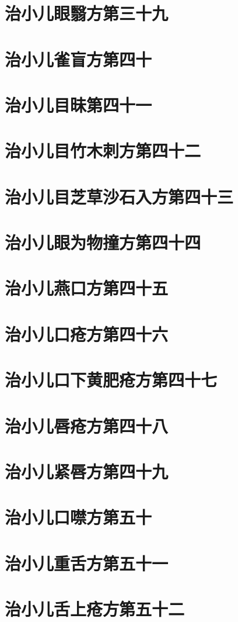 \documentclass[a4paper,12pt,UTF8,twoside]{ctexbook}
\begin{document}
\chapter{治小儿眼翳方第三十九}
\chapter{治小儿雀盲方第四十}
\chapter{治小儿目昧第四十一}
\chapter{治小儿目竹木刺方第四十二}
\chapter{治小儿目芝草沙石入方第四十三}
\chapter{治小儿眼为物撞方第四十四}
\chapter{治小儿燕口方第四十五}
\chapter{治小儿口疮方第四十六}
\chapter{治小儿口下黄肥疮方第四十七}
\chapter{治小儿唇疮方第四十八}
\chapter{治小儿紧唇方第四十九}
\chapter{治小儿口噤方第五十}
\chapter{治小儿重舌方第五十一}
\chapter{治小儿舌上疮方第五十二}
\end{document}
